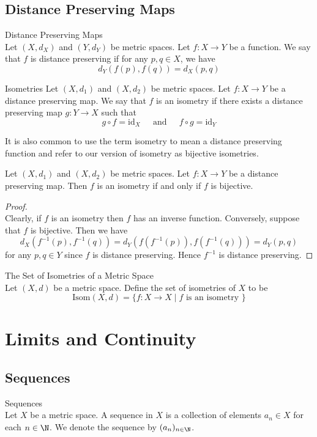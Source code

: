 \documentclass[a4paper]{article}
\begin{document}
\subsection{Distance Preserving Maps}
\begin{defn}{Distance Preserving Maps}{}\\
Let $(X,d_X)$ and $(Y,d_Y)$ be metric spaces. Let $f:X\to Y$ be a function. We say that $f$ is distance preserving if for any $p,q\in X$, we have $$d_Y(f(p),f(q))=d_X(p,q)$$
\end{defn}

\begin{defn}{Isometries}{} Let $(X,d_1)$ and $(X,d_2)$ be metric spaces. Let $f:X\to Y$ be a distance preserving map. We say that $f$ is an isometry if there exists a distance preserving map $g:Y\to X$ such that $$g\circ f=\text{id}_X\;\;\;\;\text{ and }\;\;\;\;f\circ g=\text{id}_Y$$
\end{defn}

It is also common to use the term isometry to mean a distance preserving function and refer to our version of isometry as bijective isometries. 

\begin{lmm}{}{} Let $(X,d_1)$ and $(X,d_2)$ be metric spaces. Let $f:X\to Y$ be a distance preserving map. Then $f$ is an isometry if and only if $f$ is bijective. 
\begin{proof}\\
Clearly, if $f$ is an isometry then $f$ has an inverse function. Conversely, suppose that $f$ is bijective. Then we have $$d_X(f^{-1}(p),f^{-1}(q))=d_Y(f(f^{-1}(p)),f(f^{-1}(q)))=d_Y(p,q)$$ for any $p,q\in Y$ since $f$ is distance preserving. Hence $f^{-1}$ is distance preserving. 
\end{proof}
\end{lmm}

\begin{defn}{The Set of Isometries of a Metric Space}{}\\
Let $(X,d)$ be a metric space. Define the set of isometries of $X$ to be $$\text{Isom}(X,d)=\{f:X\to X\;|\;f\text{ is an isometry }\}$$
\end{defn}

\pagebreak
\section{Limits and Continuity}
\subsection{Sequences}
\begin{defn}{Sequences}{}\\
Let $X$ be a metric space. A sequence in $X$ is a collection of elements $a_n\in X$ for each $n\in\N$. We denote the sequence by $(a_n)_{n\in\N}$. 
\end{defn}
\end{document}
